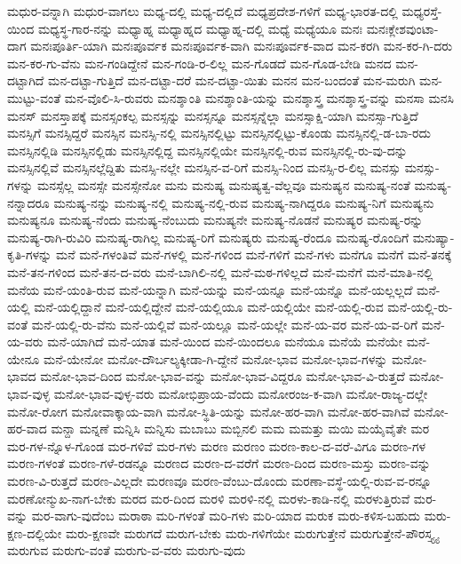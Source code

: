 {ಮಧುರ-ವನ್ನಾಗಿ
ಮಧುರ-ವಾಗಲು
ಮಧ್ಯ-ದಲ್ಲಿ
ಮಧ್ಯ-ದಲ್ಲಿದೆ
ಮಧ್ಯಪ್ರದೇಶ-ಗಳಿಗೆ
ಮಧ್ಯ-ಭಾರತ-ದಲ್ಲಿ
ಮಧ್ಯರಸ್ತೆ-ಯಿಂದ
ಮಧ್ಯಸ್ಥ-ಗಾರ-ನನ್ನು
ಮಧ್ಯಾಹ್ನ
ಮಧ್ಯಾಹ್ನದ
ಮಧ್ಯಾಹ್ನ-ದಲ್ಲಿ
ಮಧ್ಯೆ
ಮಧ್ಯೆಯೂ
ಮನಃ
ಮನಃಕ್ಲೇಶವುಂಟಾ-ದಾಗ
ಮನಃಪೂರ್ತಿ-ಯಾಗಿ
ಮನಃಪೂರ್ವಕ
ಮನಃಪೂರ್ವಕ-ವಾಗಿ
ಮನಃಪೂರ್ವಕ-ವಾದ
ಮನ-ಕರಗಿ
ಮನ-ಕರ-ಗಿ-ದರು
ಮನ-ಕರ-ಗು-ವೆನು
ಮನ-ಗಂಡಿದ್ದೇನೆ
ಮನ-ಗಂಡಿ-ರ-ಲಿಲ್ಲ
ಮನ-ಗೊಡದೆ
ಮನ-ಗೊಡ-ಬೇಡಿ
ಮನದ
ಮನ-ದಟ್ಟಾಗಿದೆ
ಮನ-ದಟ್ಟಾ-ಗುತ್ತಿದೆ
ಮನ-ದಟ್ಟಾ-ದರೆ
ಮನ-ದಟ್ಟಾ-ಯಿತು
ಮನನ
ಮನ-ಬಂದಂತೆ
ಮನ-ಮರುಗಿ
ಮನ-ಮುಟ್ಟು-ವಂತೆ
ಮನ-ವೊಲಿ-ಸಿ-ರುವರು
ಮನಶ್ಶಾಂತಿ
ಮನಶ್ಶಾಂತಿ-ಯನ್ನು
ಮನಶ್ಶಾಸ್ತ್ರ
ಮನಶ್ಶಾಸ್ತ್ರ-ವನ್ನು
ಮನಸಾ
ಮನಸಿ
ಮನಸ್
ಮನಸ್ತಾಪಕ್ಕೆ
ಮನಸ್ಸಂಕಲ್ಪ
ಮನಸ್ಸನ್ನು
ಮನಸ್ಸನ್ನೂ
ಮನಸ್ಸನ್ನೆಲ್ಲಾ
ಮನಸ್ಸಾಕ್ಷಿ-ಯಾಗಿ
ಮನಸ್ಸಾ-ಗುತ್ತಿದೆ
ಮನಸ್ಸಿಗೆ
ಮನಸ್ಸಿದ್ದರೆ
ಮನಸ್ಸಿನ
ಮನಸ್ಸಿ-ನಲ್ಲಿ
ಮನಸ್ಸಿನಲ್ಲಿಟ್ಟು
ಮನಸ್ಸಿನಲ್ಲಿಟ್ಟು-ಕೊಂಡು
ಮನಸ್ಸಿನಲ್ಲಿ-ಡ-ಬಾ-ರದು
ಮನಸ್ಸಿನಲ್ಲಿಡಿ
ಮನಸ್ಸಿನಲ್ಲಿಡು
ಮನಸ್ಸಿನಲ್ಲಿದ್ದ
ಮನಸ್ಸಿನಲ್ಲಿಯೇ
ಮನಸ್ಸಿನಲ್ಲಿ-ರುವ
ಮನಸ್ಸಿನಲ್ಲಿ-ರು-ವು-ದನ್ನು
ಮನಸ್ಸಿನಲ್ಲಿವೆ
ಮನಸ್ಸಿನಲ್ಲೆದ್ದಿತು
ಮನಸ್ಸಿ-ನಲ್ಲೇ
ಮನಸ್ಸಿನ-ವ-ರಿಗೆ
ಮನಸ್ಸಿ-ನಿಂದ
ಮನಸ್ಸಿ-ರ-ಲಿಲ್ಲ
ಮನಸ್ಸು
ಮನಸ್ಸು-ಗಳನ್ನು
ಮನಸ್ಸೆಲ್ಲ
ಮನಸ್ಸೇ
ಮನಸ್ಸೇನೋ
ಮನು
ಮನುಷ್ಯ
ಮನುಷ್ಯತ್ವ-ವೆಲ್ಲವೂ
ಮನುಷ್ಯನ
ಮನುಷ್ಯ-ನಂತೆ
ಮನುಷ್ಯ-ನನ್ನಾದರೂ
ಮನುಷ್ಯ-ನನ್ನು
ಮನುಷ್ಯ-ನಲ್ಲಿ
ಮನುಷ್ಯ-ನಲ್ಲಿ-ರುವ
ಮನುಷ್ಯ-ನಾಗಿದ್ದರೂ
ಮನುಷ್ಯ-ನಿಗೆ
ಮನುಷ್ಯನು
ಮನುಷ್ಯನೂ
ಮನುಷ್ಯ-ನೆಂದು
ಮನುಷ್ಯ-ನೆಂಬುದು
ಮನುಷ್ಯನೇ
ಮನುಷ್ಯ-ನೊಡನೆ
ಮನುಷ್ಯರ
ಮನುಷ್ಯ-ರನ್ನು
ಮನುಷ್ಯ-ರಾಗಿ-ರುವಿರಿ
ಮನುಷ್ಯ-ರಾಗಿಲ್ಲ
ಮನುಷ್ಯ-ರಿಗೆ
ಮನುಷ್ಯರು
ಮನುಷ್ಯ-ರೆಂದೂ
ಮನುಷ್ಯ-ರೊಂದಿಗೆ
ಮನುಷ್ಯಾ-ಕೃತಿ-ಗಳನ್ನು
ಮನೆ
ಮನೆ-ಗಳಂತಿವೆ
ಮನೆ-ಗಳಲ್ಲಿ
ಮನೆ-ಗಳಿಂದ
ಮನೆ-ಗಳಿಗೆ
ಮನೆ-ಗಳು
ಮನೆಗೂ
ಮನೆಗೆ
ಮನೆ-ತನಕ್ಕೆ
ಮನೆ-ತನ-ಗಳಿಂದ
ಮನೆ-ತನ-ದ-ವರು
ಮನೆ-ಬಾಗಿಲಿ-ನಲ್ಲಿ
ಮನೆ-ಮಠ-ಗಳಿಲ್ಲದೆ
ಮನೆ-ಮನೆಗೆ
ಮನೆ-ಮಾತಿ-ನಲ್ಲಿ
ಮನೆಯ
ಮನೆ-ಯಂತಿ-ರುವ
ಮನೆ-ಯನ್ನಾಗಿ
ಮನೆ-ಯನ್ನು
ಮನೆ-ಯನ್ನೂ
ಮನೆ-ಯನ್ನೊ
ಮನೆ-ಯಲ್ಲಲ್ಲದೆ
ಮನೆ-ಯಲ್ಲಿ
ಮನೆ-ಯಲ್ಲಿದ್ದಾನೆ
ಮನೆ-ಯಲ್ಲಿದ್ದೇನೆ
ಮನೆ-ಯಲ್ಲಿಯೂ
ಮನೆ-ಯಲ್ಲಿಯೇ
ಮನೆ-ಯಲ್ಲಿ-ರುವ
ಮನೆ-ಯಲ್ಲಿ-ರು-ವಂತೆ
ಮನೆ-ಯಲ್ಲಿ-ರು-ವೆನು
ಮನೆ-ಯಲ್ಲಿವೆ
ಮನೆ-ಯಲ್ಲೂ
ಮನೆ-ಯಲ್ಲೇ
ಮನೆ-ಯ-ವರ
ಮನೆ-ಯ-ವ-ರಿಗೆ
ಮನೆ-ಯ-ವರು
ಮನೆ-ಯಾಗಿದೆ
ಮನೆ-ಯಾತ
ಮನೆ-ಯಿಂದ
ಮನೆ-ಯಿಂದಲೂ
ಮನೆಯೂ
ಮನೆಯೆ
ಮನೆಯೇ
ಮನೆ-ಯೇನೂ
ಮನೆ-ಯೇನೋ
ಮನೋ-ದೌರ್ಬಲ್ಯಕ್ಕೀಡಾ-ಗಿ-ದ್ದೇನೆ
ಮನೋ-ಭಾವ
ಮನೋ-ಭಾವ-ಗಳನ್ನು
ಮನೋ-ಭಾವದ
ಮನೋ-ಭಾವ-ದಿಂದ
ಮನೋ-ಭಾವ-ವನ್ನು
ಮನೋ-ಭಾವ-ವಿದ್ದರೂ
ಮನೋ-ಭಾವ-ವಿ-ರುತ್ತದೆ
ಮನೋ-ಭಾವ-ವುಳ್ಳ
ಮನೋ-ಭಾವ-ವುಳ್ಳ-ವರು
ಮನೋಭಿಪ್ರಾಯ-ವೆಂದು
ಮನೋರಂಜ-ಕ-ವಾಗಿ
ಮನೋ-ರಾಜ್ಯ-ದಲ್ಲೇ
ಮನೋ-ರೋಗ
ಮನೋವಾಕ್ಕಾಯ-ವಾಗಿ
ಮನೋ-ಸ್ಥಿತಿ-ಯನ್ನು
ಮನೋ-ಹರ-ವಾಗಿ
ಮನೋ-ಹರ-ವಾಗಿವೆ
ಮನೋ-ಹರ-ವಾದ
ಮನ್ದಾ
ಮನ್ನಣೆ
ಮನ್ನಿಸಿ
ಮನ್ನಿಸು
ಮಬಾಬು
ಮಬ್ಬಿನಲಿ
ಮಮ
ಮಮತ್ತು
ಮಯಿ
ಮಯೈವೈತೇ
ಮರ
ಮರ-ಗಳ-ನ್ನೊಳ-ಗೊಂಡ
ಮರ-ಗಳಿವೆ
ಮರ-ಗಳು
ಮರಣ
ಮರಣಂ
ಮರಣ-ಕಾಲ-ದ-ವರೆ-ವಿಗೂ
ಮರಣ-ಗಳ
ಮರಣ-ಗಳಂತೆ
ಮರಣ-ಗಳೆ-ರಡನ್ನೂ
ಮರಣದ
ಮರಣ-ದ-ವರೆಗೆ
ಮರಣ-ದಿಂದ
ಮರಣ-ಮಸ್ತು
ಮರಣ-ವನ್ನು
ಮರಣ-ವಿ-ರುತ್ತದೆ
ಮರಣ-ವಿಲ್ಲದೇ
ಮರಣವೂ
ಮರಣ-ವೆಂಬು-ದೊಂದು
ಮರಣಾ-ವಸ್ಥೆ-ಯಲ್ಲಿ-ರುವ-ವ-ರನ್ನೂ
ಮರಣೋನ್ಮುಖ-ನಾಗ-ಬೇಕು
ಮರದ
ಮರ-ದಿಂದ
ಮರಳಿ
ಮರಳಿ-ನಲ್ಲಿ
ಮರಳು-ಕಾಡಿ-ನಲ್ಲಿ
ಮರಳುತ್ತಿರುವೆ
ಮರ-ವನ್ನು
ಮರ-ವಾಗು-ವುದೆಂಬ
ಮರಾಠಾ
ಮರಿ-ಗಳಂತೆ
ಮರಿ-ಗಳು
ಮರಿ-ಯಾದ
ಮರುಕ
ಮರು-ಕಳಿಸ-ಬಹುದು
ಮರು-ಕ್ಷಣ-ದಲ್ಲಿಯೇ
ಮರು-ಕ್ಷಣವೇ
ಮರುಗದೆ
ಮರುಗ-ಬೇಕು
ಮರು-ಗಳಿಗೆಯೇ
ಮರುಗುತ್ತೇನೆ
ಮರುಗುತ್ತೇನೆ-ಪೌರಸ್ತ್ಯ್ಯ
ಮರುಗುವ
ಮರುಗು-ವಂತೆ
ಮರುಗು-ವ-ವರು
ಮರುಗು-ವುದು
}
